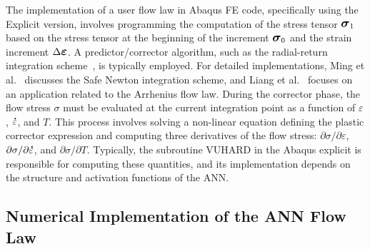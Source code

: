 \documentclass[algorithms,article,accept,pdftex,oneauthor]{Definitions/mdpi}
\DeclareRobustCommand{\mdot}[1]{\accentset{\mbox{\bfseries .}}{#1}}
\DeclareRobustCommand{\Sig}{\mbox{\large\ensuremath{\boldsymbol{\sigma}}}}
\DeclareRobustCommand{\Eps}{\mbox{\large\ensuremath{\boldsymbol{\varepsilon}}}}
\begin{document}
The implementation of a user flow law in Abaqus FE code, specifically using the Explicit version, involves programming the computation of the stress tensor $\Sig_{1}$ based on the stress tensor at the beginning of the increment $\Sig_{0}$ and the strain increment $\Delta\Eps$.
A predictor/corrector algorithm, such as the radial-return integration scheme~\cite{Ponthot-2002-USU}, is typically employed.
For detailed implementations, Ming et al.~\cite{Ming-2018-ERV} discusses the Safe Newton integration scheme, and Liang et al.~\cite{Liang-2022} focuses on an application related to the Arrhenius flow law.
During the corrector phase, the flow stress $\sigma$ must be evaluated at the current integration point as a function of $\varepsilon$, $\mdot{\varepsilon}$, and $T$.
This process involves solving a non-linear equation defining the plastic corrector expression and computing three derivatives of the flow stress: $\partial\sigma/\partial\varepsilon$, $\partial\sigma/\partial\mdot{\varepsilon}$, and $\partial\sigma/\partial T$.
Typically, the subroutine VUHARD in the Abaqus explicit is responsible for computing these quantities, and its implementation depends on the structure and activation functions of the ANN.

\subsection{Numerical Implementation of the ANN Flow Law}\label{subsec:Num-impl}
\end{document}
